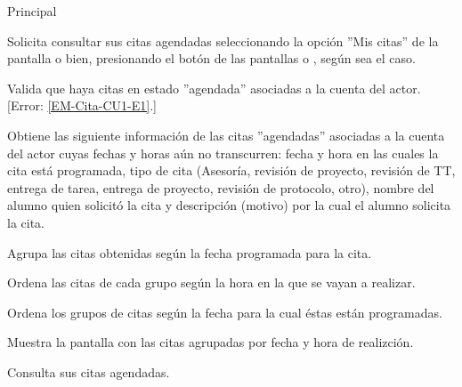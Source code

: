 \begin{UCtrayectoria}{Principal}

	\UCpaso [\UCactor] Solicita consultar sus citas agendadas seleccionando la opción ''Mis citas'' de la pantalla  o bien, presionando el botón  de las pantallas  o , según sea el caso.

	\UCpaso Valida que haya citas en estado ''agendada'' asociadas a la cuenta del actor. [Error: \ref{EM-Cita-CU1-E1}.]

	\UCpaso Obtiene las siguiente información de las citas ''agendadas'' asociadas a la cuenta del actor cuyas fechas y horas aún no transcurren: fecha y hora en las cuales la cita está programada, tipo de cita (Asesoría, revisión de proyecto, revisión de TT, entrega de tarea, entrega de proyecto, revisión de protocolo, otro), nombre del alumno quien solicitó la cita y descripción (motivo) por la cual el alumno solicita la cita.

	\UCpaso Agrupa las citas obtenidas según la fecha programada para la cita.

	\UCpaso Ordena las citas de cada grupo según la hora en la que se vayan a realizar. 

	\UCpaso Ordena los grupos de citas según la fecha para la cual éstas están programadas.

	\UCpaso Muestra la pantalla  con las citas agrupadas por fecha y hora de realizción. 

	\UCpaso [\UCactor] Consulta sus citas agendadas. 

\end{UCtrayectoria}
